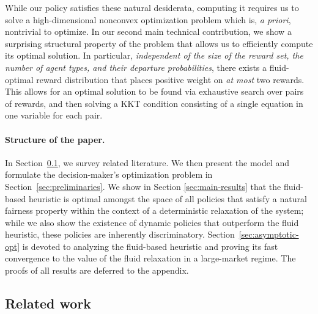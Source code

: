 \documentclass[12pt]{article}
\begin{document}
{While our policy satisfies these natural desiderata,} computing it requires us to solve a high-dimensional nonconvex optimization problem which is, \emph{a priori}, nontrivial to optimize. In our second main technical contribution, we show a surprising structural property of the problem that allows us to efficiently compute its optimal solution. In particular, {\it independent of the size of the reward set, the number of agent types, and their departure probabilities}, there exists a fluid-optimal reward distribution that places positive weight on {\it at most} two rewards. This allows for an optimal solution to be found via exhaustive search over pairs of rewards, and then solving a KKT condition consisting of a single equation in one variable for each pair. 
 


\paragraph{Structure of the paper.} In Section~\ref{ssec:related-work}, we survey related literature. We then present the model and formulate the decision-maker's optimization problem in Section~\ref{sec:preliminaries}. We show in Section \ref{sec:main-results} that the fluid-based heuristic is optimal amongst the space of all policies that satisfy a natural fairness property within the context of a deterministic relaxation of the system; while we also show the existence of dynamic policies that outperform the fluid heuristic, these policies are inherently discriminatory. Section~\ref{sec:asymptotic-opt} is devoted to analyzing the fluid-based heuristic and proving its fast convergence to the value of the fluid relaxation in a large-market regime. %
The proofs of all results are deferred to the appendix.


\subsection{Related work}\label{ssec:related-work}
\end{document}

